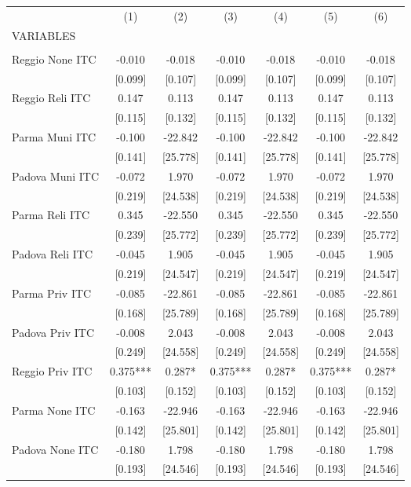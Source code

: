 \begin{tabular}{lcccccc} \hline
 & (1) & (2) & (3) & (4) & (5) & (6) \\
VARIABLES &  &  &  &  &  &  \\ \hline
 &  &  &  &  &  &  \\
Reggio None ITC & -0.010 & -0.018 & -0.010 & -0.018 & -0.010 & -0.018 \\
 & [0.099] & [0.107] & [0.099] & [0.107] & [0.099] & [0.107] \\
Reggio Reli ITC & 0.147 & 0.113 & 0.147 & 0.113 & 0.147 & 0.113 \\
 & [0.115] & [0.132] & [0.115] & [0.132] & [0.115] & [0.132] \\
Parma Muni ITC & -0.100 & -22.842 & -0.100 & -22.842 & -0.100 & -22.842 \\
 & [0.141] & [25.778] & [0.141] & [25.778] & [0.141] & [25.778] \\
Padova Muni ITC & -0.072 & 1.970 & -0.072 & 1.970 & -0.072 & 1.970 \\
 & [0.219] & [24.538] & [0.219] & [24.538] & [0.219] & [24.538] \\
Parma Reli ITC & 0.345 & -22.550 & 0.345 & -22.550 & 0.345 & -22.550 \\
 & [0.239] & [25.772] & [0.239] & [25.772] & [0.239] & [25.772] \\
Padova Reli ITC & -0.045 & 1.905 & -0.045 & 1.905 & -0.045 & 1.905 \\
 & [0.219] & [24.547] & [0.219] & [24.547] & [0.219] & [24.547] \\
Parma Priv ITC & -0.085 & -22.861 & -0.085 & -22.861 & -0.085 & -22.861 \\
 & [0.168] & [25.789] & [0.168] & [25.789] & [0.168] & [25.789] \\
Padova Priv ITC & -0.008 & 2.043 & -0.008 & 2.043 & -0.008 & 2.043 \\
 & [0.249] & [24.558] & [0.249] & [24.558] & [0.249] & [24.558] \\
Reggio Priv ITC & 0.375*** & 0.287* & 0.375*** & 0.287* & 0.375*** & 0.287* \\
 & [0.103] & [0.152] & [0.103] & [0.152] & [0.103] & [0.152] \\
Parma None ITC & -0.163 & -22.946 & -0.163 & -22.946 & -0.163 & -22.946 \\
 & [0.142] & [25.801] & [0.142] & [25.801] & [0.142] & [25.801] \\
Padova None ITC & -0.180 & 1.798 & -0.180 & 1.798 & -0.180 & 1.798 \\
 & [0.193] & [24.546] & [0.193] & [24.546] & [0.193] & [24.546] \\

\end{tabular}
